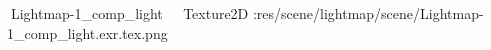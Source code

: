   Lightmap-1_comp_light            	   Texture2D
   :   res/scene/lightmap/scene/Lightmap-1_comp_light.exr.tex.png